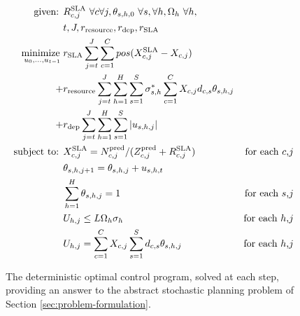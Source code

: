 \begin{figure}[h!]
\begin{align*}
  \text{given: }   
  &  R_{c,j}^\text{SLA}\ \forall c\forall j, 
    \theta_{s,h,0}\  \forall s,\forall h,  
   \Omega_{h}\ \forall h,  \\
  &  t,J,r_{\text{resource}},  r_{\text{dep}}, r_{\text{SLA}}  \\   
  \underset{u_0,...,u_{t-1}} {\text{minimize } } 
	  & r_{\text{SLA}} \sum^{J}_{j=t} \sum^C_{c=1}  pos(X_{c,j}^\text{SLA}-X_{c,j})  \\
  + & r_{\text{resource}} \sum^{J}_{j=t} \sum^H_{h=1} \sum^S_{s=1}  \sigma^*_{s,h} \sum_{c=1}^C X_{c,j} d_{c,s} \theta_{s,h,j}   \\ 
  + & r_{\text{dep}}  \sum^{J}_{j=t} \sum^H_{h=1} \sum^S_{s=1} |u_{s,h,j} |   \\
\text{subject to: }  
& X_{c,j}^\text{SLA}=N^{\text{pred}}_{c,j}/(Z^{\text{pred}}_{c,j}+  R_{c,j}^\text{SLA})  & \text{for each  $c$,$j$}  \\ 
&  \theta_{s,h,j+1} = \theta_{s,h,j} +  u_{s,h,t}  \nonumber \\
& \sum_{h=1}^{H} \theta_{s,h,j} = 1 & \text{for each $s$,$j$} \nonumber \\  
& U_{h,j} \le  L \Omega_{h} \sigma_h & \text{for each $h$,$j$} \nonumber \\ 
& U_{h,j} = \sum_{c=1}^C X_{c,j} \sum_{s=1}^S d_{c,s} \theta_{s,h,j} & \text{for each $h$,$j$} \nonumber  \\ 
\end{align*}
\caption[The deterministic optimal control program, solved at each step of the MPC optimization.]{The deterministic optimal control program, solved at each step, providing an answer to the abstract stochastic planning problem of Section \ref{sec:problem-formulation}.}
\label{fig:mpc_optimization_problem} 
\end{figure}

